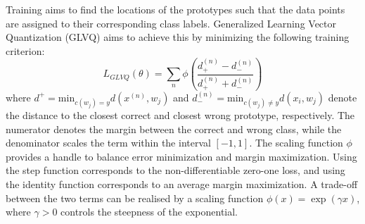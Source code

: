 \documentclass{esannV2}
\begin{document}
Training aims to find the locations of the prototypes such that the data points are assigned to their corresponding class labels. Generalized Learning Vector Quantization (GLVQ) \cite{sato1996generalized} aims to achieve this by minimizing the following training criterion:
\begin{equation}
 L_{GLVQ}(\theta) = \sum_n \phi\left(\frac{d^{(n)}_+ - d^{(n)}_-}{d^{(n)}_+ + d^{(n)}_-}\right)
\end{equation}
where $d^+ = \mbox{min}_{c(w_j) = y} d(x^{(n)}, w_j)$ and $d^{(n)}_- = \mbox{min}_{c(w_j)\neq y} d(x_i, w_j)$ denote the distance to the closest correct and closest wrong prototype, respectively. The numerator denotes the margin between the correct and wrong class, while the denominator scales the term within the interval $[-1, 1]$. The scaling function $\phi$ provides a handle to balance error minimization and margin maximization. Using the step function corresponds to the non-differentiable zero-one loss, and using the identity function corresponds to an average margin maximization. A trade-off between the two terms can be realised by a scaling function $\phi(x) = \exp(\gamma x)$, where $\gamma > 0$ controls the steepness of the exponential. 
\end{document}

